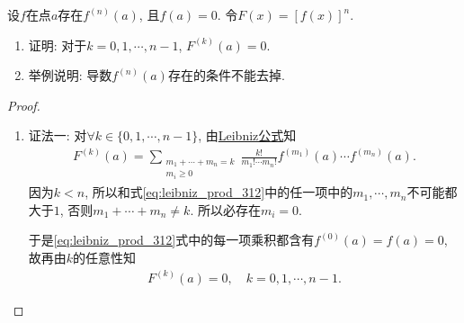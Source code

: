 \documentclass[../../main.tex]{subfiles}%
\begin{document}
\begin{example}
设$f$在点$a$存在$f^{(n)}(a)$, 且$f(a)=0$. 令$F(x)=[f(x)]^n$.
\begin{enumerate}[(1)]
\item 证明: 对于$k=0,1,\cdots,n-1$, $F^{(k)}(a)=0$. 

\item 举例说明: 导数$f^{(n)}(a)$存在的条件不能去掉.
\end{enumerate}
\end{example}
\begin{proof}
\begin{enumerate}[(1)]
\item {\color{blue}证法一:} 对$\forall k\in \{0,1,\cdots,n-1\}$, 由\hyperref[theorem:Leibniz公式]{Leibniz公式}知
\begin{align}
F^{(k)}(a) = \sum\limits_{\substack{m_1+\cdots+m_n=k \\ m_i\geqslant 0}} \frac{k!}{m_1!\cdots m_n!} f^{(m_1)}(a) \cdots f^{(m_n)}(a).
\label{eq:leibniz_prod_312}
\end{align}
因为$k<n$, 所以和式\eqref{eq:leibniz_prod_312}中的任一项中的$m_1,\cdots,m_n$不可能都大于$1$, 否则$m_1+\cdots+m_n\ne k$. 所以必存在$m_i=0$.

于是\eqref{eq:leibniz_prod_312}式中的每一项乘积都含有$f^{(0)}(a)=f(a)=0$, 故再由$k$的任意性知
\begin{align*}
F^{(k)}(a) = 0,\quad k=0,1,\cdots,n-1.
\end{align*}


\end{enumerate}
\end{proof}
\end{document}
